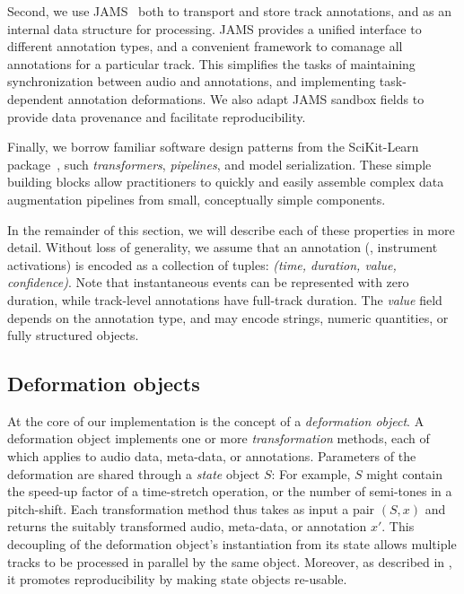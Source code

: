 \documentclass{article}
\begin{document}
Second, we use JAMS~\cite{humphreyjams} both to transport and store track annotations, 
and as an internal data structure for processing.
JAMS provides a unified interface to different annotation types, and a convenient framework to comanage all annotations
for a particular track.
This simplifies the tasks of maintaining synchronization between audio and annotations,
and implementing task-dependent annotation deformations.  
We also adapt JAMS sandbox fields to provide data provenance and facilitate reproducibility.

%
Finally, we borrow familiar software design patterns from the SciKit-Learn
package~\cite{buitinck2013api}, such \emph{transformers}, \emph{pipelines}, 
and model serialization.  These simple building blocks allow
practitioners to quickly and easily assemble complex data augmentation pipelines 
from small, conceptually simple components.


In the remainder of this section, we will describe each of these
properties in more detail.  Without loss of generality, we assume that an
annotation (\eg, instrument activations) is encoded as a collection of
tuples: \emph{(time, duration, value, confidence)}.
Note that instantaneous events can be represented with zero duration, while
track-level annotations have full-track duration.  The \emph{value} field depends on
the annotation type, and may encode strings, numeric quantities, or fully structured
objects.

\subsection{Deformation objects}

At the core of our implementation is the concept of a \emph{deformation object}.
A deformation object implements one or more \emph{transformation} methods, each of which
applies to audio data, meta-data, or annotations.
Parameters of the deformation are shared through a \emph{state} object $S$:
For example, $S$ might contain the speed-up factor of a
time-stretch operation, or the number of semi-tones in a pitch-shift.  
Each transformation method thus takes as input a pair $(S, x)$ and
returns the suitably transformed audio, meta-data, or annotation $x'$.
This decoupling of the deformation object's instantiation from
its state allows multiple tracks to be processed in parallel by the same object.
Moreover, as described in , it promotes reproducibility 
by making state objects re-usable.
\end{document}
